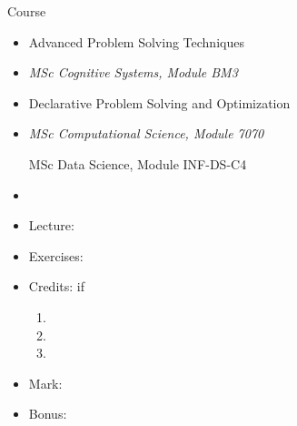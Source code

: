 \begin{frame}{Course}
  \begin{itemize}
  \item<1|only@1> \alert{Advanced Problem Solving Techniques}
  \item<1|only@1> [] {\em MSc Cognitive Systems, Module BM3\par\phantom{MSc}}
  \item<2|only@2> \alert{Declarative Problem Solving and Optimization}
  \item<2|only@2> [] {\em MSc Computational Science, Module 7070\par
                          MSc Data Science, Module INF-DS-C4}
  \item []
  \item Lecture:    \only<1,2>{2h weekly}
  \item Exercises:  
  \item Credits:    
    if
    \begin{enumerate}
    \item {}
    \item {}
    \item {}
    \end{enumerate}
  \item Mark: 
  \item Bonus: %
  \end{itemize}
\end{frame}
%
